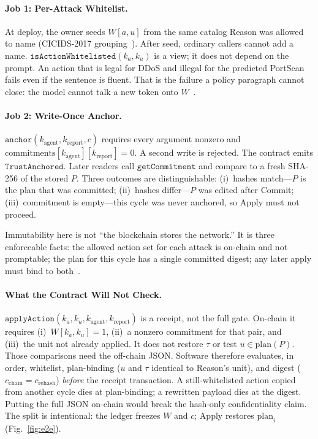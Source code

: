 \paragraph{Job 1: Per-Attack Whitelist.}
At deploy, the owner seeds $W[a,u]$ from the same catalog Reason was allowed to name (CICIDS-2017 grouping~\cite{sharafaldin2018}). After seed, ordinary callers cannot add a name. $\mathtt{isActionWhitelisted}(k_a,k_u)$ is a view; it does not depend on the prompt. An action that is legal for DDoS and illegal for the predicted PortScan fails even if the sentence is fluent. That is the failure a policy paragraph cannot close: the model cannot talk a new token onto $W$~\cite{jan2025,singh2025zt}.

\paragraph{Job 2: Write-Once Anchor.}
$\mathtt{anchor}(k_{\mathrm{agent}},k_{\mathrm{report}},c)$ requires every argument nonzero and $\mathrm{commitments}[k_{\mathrm{agent}}][k_{\mathrm{report}}]=0$. A second write is rejected. The contract emits $\mathtt{TrustAnchored}$. Later readers call $\mathtt{getCommitment}$ and compare to a fresh SHA-256 of the stored $P$. Three outcomes are distinguishable: (i)~hashes match---$P$ is the plan that was committed; (ii)~hashes differ---$P$ was edited after Commit; (iii)~commitment is empty---this cycle was never anchored, so Apply must not proceed.

Immutability here is not ``the blockchain stores the network.'' It is three enforceable facts: the allowed action set for each attack is on-chain and not promptable; the plan for this cycle has a single committed digest; any later apply must bind to both~\cite{alqithami2026,pendli2025}.

\paragraph{What the Contract Will Not Check.}
$\mathtt{applyAction}(k_a,k_u,k_{\mathrm{agent}},k_{\mathrm{report}})$ is a receipt, not the full gate. On-chain it requires (i)~$W[k_a,k_u]=1$, (ii)~a nonzero commitment for that pair, and (iii)~the unit not already applied. It does not restore $\tau$ or test $u\in\mathrm{plan}(P)$. Those comparisons need the off-chain JSON. Software therefore evaluates, in order, whitelist, plan-binding ($u$ and $\tau$ identical to Reason's unit), and digest ($c_{\mathrm{chain}}=c_{\mathrm{rehash}}$) \emph{before} the receipt transaction. A still-whitelisted action copied from another cycle dies at plan-binding; a rewritten payload dies at the digest. Putting the full JSON on-chain would break the hash-only confidentiality claim. The split is intentional: the ledger freezes $W$ and $c$; Apply restores $\mathrm{plan}_i$ (Fig.~\ref{fig:e2e}).

